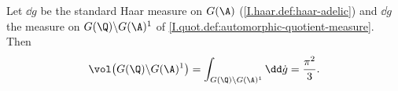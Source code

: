 Let $\dd g$ be the standard Haar measure on $G(\A)$ (\cref{I.haar.def:haar-adelic}) and $\dd\dot g$ the measure on
$G(\Q)\backslash G(\A)^1$ of \cref{I.quot.def:automorphic-quotient-measure}. Then
\[
  \vol\bigl(G(\Q)\backslash G(\A)^1\bigr)=\int_{G(\Q)\backslash G(\A)^1}\dd\dot g=\frac{\pi^2}{3}.
\]
